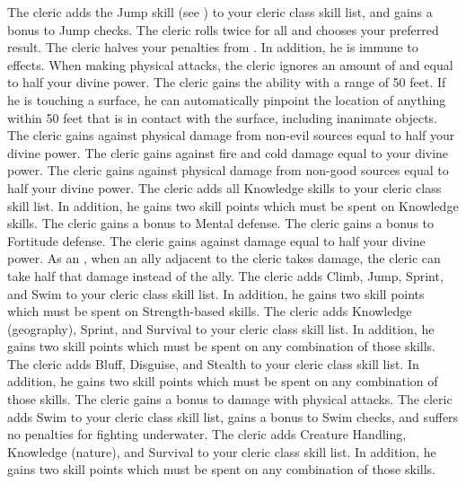             The cleric adds the Jump skill (see ) to your cleric class skill list, and gains a  bonus to Jump checks.
            The cleric rolls twice for all  and chooses your preferred result.
            The cleric halves your penalties from .
            In addition, he is immune to  effects.
            When making physical attacks, the cleric ignores an amount of  and  equal to half your divine power.
            The cleric gains the  ability with a range of 50 feet.
            If he is touching a surface, he can automatically pinpoint the location of anything within 50 feet that is in contact with the surface, including inanimate objects.
            The cleric gains  against physical damage from non-evil sources equal to half your divine power.
            The cleric gains  against fire and cold damage equal to your divine power.
            The cleric gains  against physical damage from non-good sources equal to half your divine power.
            The cleric adds all Knowledge skills to your cleric class skill list.
            In addition, he gains two skill points which must be spent on Knowledge skills.
            The cleric gains a  bonus to Mental defense.
            The cleric gains a  bonus to Fortitude defense.
            The cleric gains  against  damage equal to half your divine power.
            As an , when an ally adjacent to the cleric takes damage, the cleric can take half that damage instead of the ally.
            The cleric adds Climb, Jump, Sprint, and Swim to your cleric class skill list.
            In addition, he gains two skill points which must be spent on Strength-based skills.
            The cleric adds Knowledge (geography), Sprint, and Survival to your cleric class skill list.
            In addition, he gains two skill points which must be spent on any combination of those skills.
            The cleric adds Bluff, Disguise, and Stealth to your cleric class skill list.
            In addition, he gains two skill points which must be spent on any combination of those skills.
            The cleric gains a  bonus to damage with physical attacks.
            The cleric adds Swim to your cleric class skill list, gains a  bonus to Swim checks, and suffers no penalties for fighting underwater.
            The cleric adds Creature Handling, Knowledge (nature), and Survival to your cleric class skill list.
            In addition, he gains two skill points which must be spent on any combination of those skills.

